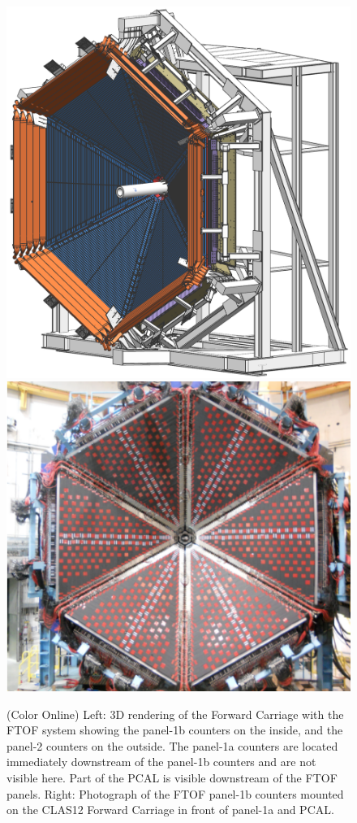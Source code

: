 \documentclass[final,3p,twocolumn]{elsarticle}
\begin{document}
\begin{figure}[htbp!]
\hspace{0.3cm}\includegraphics[width=0.95\columnwidth]{fwd_carriage-1.png}
\hspace{0.3cm}\includegraphics[width=1.0\columnwidth]{FTOF-1b.png}
\caption{(Color Online) Left: 3D rendering of the Forward Carriage with the FTOF system showing the panel-1b counters on the
inside, and the panel-2 counters on the outside. The panel-1a counters are located immediately downstream of the
panel-1b counters and are not visible here. Part of the PCAL is visible downstream of the FTOF panels. Right:
Photograph of the FTOF panel-1b counters mounted on the CLAS12 Forward Carriage in front of panel-1a and PCAL.} 
\label{ftof-1b}
\end{figure}
\end{document}
